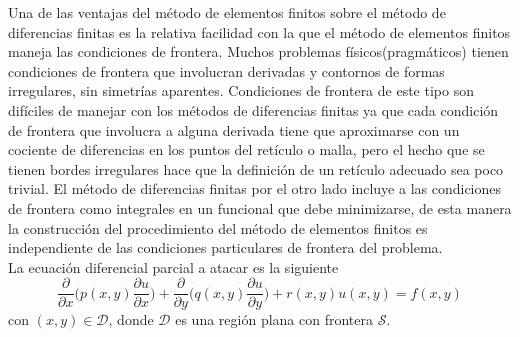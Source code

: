 \documentclass[a4paper]{article}
\begin{document}
Una de las ventajas del método de elementos finitos sobre el método de diferencias finitas es la relativa facilidad con la que el método de elementos finitos maneja las condiciones de frontera. Muchos problemas físicos(pragmáticos) tienen condiciones de frontera que involucran derivadas y contornos de formas irregulares, sin simetrías aparentes. Condiciones de frontera de este tipo son difíciles de manejar con los métodos de diferencias finitas ya que cada condición de frontera que involucra a alguna derivada tiene que aproximarse con un cociente de diferencias en los puntos del retículo o malla, pero el hecho que se tienen bordes irregulares hace que la definición de un retículo adecuado sea poco trivial. El método de diferencias finitas por el otro lado incluye a las condiciones de frontera como integrales en un funcional que debe minimizarse, de esta manera la construcción del procedimiento del método de elementos finitos es independiente de las condiciones particulares de frontera del problema.\\

La ecuación diferencial parcial a atacar es la siguiente
\begin{equation}\label{eq::partial_diff_equation}
\frac{\partial}{\partial x}\Bigg( p(x,y)\frac{\partial u}{\partial x} \Bigg) + \frac{\partial}{\partial y}\Bigg( q(x,y)\frac{\partial u}{\partial y} \Bigg) +r(x,y)u(x,y)=f(x,y)
\end{equation}
con $(x,y)\in \mathcal{D}$, donde $\mathcal{D}$ es una región plana con frontera $\mathcal{S}$.\\
\end{document}
